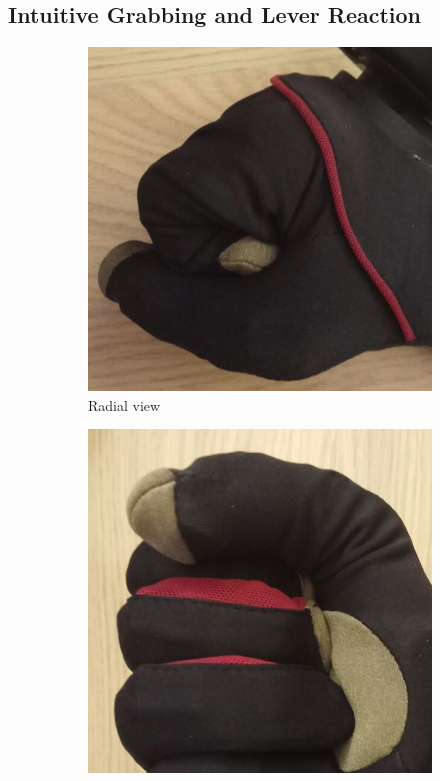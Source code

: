 \documentclass[hyperref, bachelorofscience]{cgvpub}
\begin{document}
\subsection{Intuitive Grabbing and Lever Reaction}
\begin{figure}
	\centering
	\begin{subfigure}{.45\linewidth}
		\includegraphics[width=\linewidth]{../pics/grab1}
		\caption{Radial view}
		\label{fig:grab:radial}
	\end{subfigure}
	\hfill
	\begin{subfigure}{.45\linewidth}
		\includegraphics[width=\linewidth]{../pics/grab2}

\end{subfigure}
\end{figure}
\end{document}
